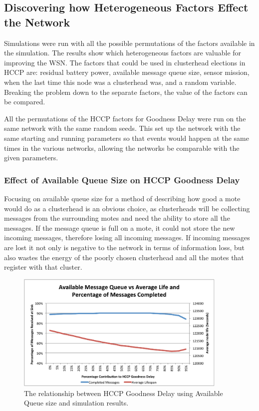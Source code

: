 \subsection{Discovering how Heterogeneous Factors Effect the Network}
Simulations were run with all the possible permutations of
the factors available in the simulation. The results show which heterogeneous
factors are valuable for improving the WSN. The factors that could be used in 
clusterhead elections in HCCP are: residual battery power, 
available message queue size, sensor mission, when the last time this node was a 
clusterhead was, and a random variable. Breaking the problem down to the separate factors, 
the value of the factors can be compared.


All the permutations of the HCCP factors for Goodness Delay were run on the same network
with the same random seeds. This set up the network with the same starting and running parameters so
that events would happen at the same times in the various networks, allowing the networks 
be comparable 
with the given parameters.

\subsubsection{Effect of Available Queue Size on HCCP Goodness Delay}


Focusing on available queue size for a method of describing how good a mote would do as a clusterhead
is an obvious choice, as clusterheads will be collecting messages from the surrounding motes and need the 
ability to store all the messages. If the message queue is full on a mote, it could not store the new incoming messages, therefore
losing all incoming messages. If incoming messages are lost it not only is negative to the network in terms of information loss,
 but also wastes the energy of the poorly chosen clusterhead and all the motes that register with that cluster.

 \begin{figure}[bthp]
 	\centering
 		\includegraphics[width=0.9\textwidth]{images/simulation/goodness/AvailableQ3.pdf}
 	\caption{The relationship between HCCP Goodness Delay using Available Queue size and simulation results.}
 	\label{fig:images_simulation_goodness_AvailableQ}
 \end{figure}



